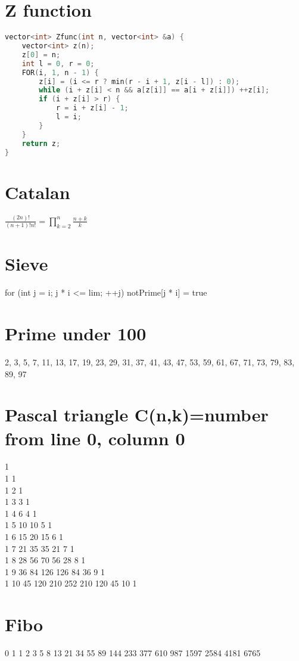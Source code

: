 \documentclass[A4 paper, 12pt]{article}
\begin{document}
	\section{Z function}
	\begin{lstlisting}[language=C++]
vector<int> Zfunc(int n, vector<int> &a) {
    vector<int> z(n);
    z[0] = n;
    int l = 0, r = 0;
    FOR(i, 1, n - 1) {
        z[i] = (i <= r ? min(r - i + 1, z[i - l]) : 0);
        while (i + z[i] < n && a[z[i]] == a[i + z[i]]) ++z[i]; 
        if (i + z[i] > r) {
            r = i + z[i] - 1;
            l = i;
        }
    }
    return z;
}
\end{lstlisting}
    
	\section{Catalan}
\(\frac{(2n)!}{(n + 1)!n!} = \prod_{k = 2}^n \frac{n + k}{k} \)
	\section{Sieve}
	for (int j = i; j * i <= lim; ++j) notPrime[j * i] = true
	\section{Prime under 100}
	2, 3, 5, 7, 11, 13, 17, 19, 23, 29, 31, 37, 41, 43, 47, 53, 59, 61, 67, 71, 73, 79, 83, 89, 97 
	\section{Pascal triangle C(n,k)=number from line 0, column 0}
1\\
1 1\\
1 2 1\\ 
1 3 3 1\\ 
1 4 6 4 1\\ 
1 5 10 10 5 1\\ 
1 6 15 20 15 6 1\\ 
1 7 21 35 35 21 7 1\\
1 8 28 56 70 56 28 8 1\\ 
1 9 36 84 126 126 84 36 9 1\\
1 10 45 120 210 252 210 120 45 10 1
	\section{Fibo}
	0 1 1 2 3 5 8 13 21 34 55 89 144 233 377 610 987 1597 2584 4181 6765
\end{document}
